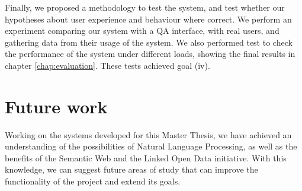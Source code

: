 Finally, we proposed a methodology to test the system, and test whether our hypotheses about user experience and behaviour where correct. We perform an experiment comparing our system with a QA interface, with real users, and gathering data from their usage of the system. We also performed test to check the performance of the system under different loads, showing the final results in chapter \ref{chap:evaluation}. These tests achieved goal (iv).

\section{Future work}

Working on the systems developed for this Master Thesis, we have achieved an understanding of the possibilities of Natural Language Processing, as well as the benefits of the Semantic Web and the Linked Open Data initiative. With this knowledge, we can suggest future areas of study that can improve the functionality of the project and extend its goals.

